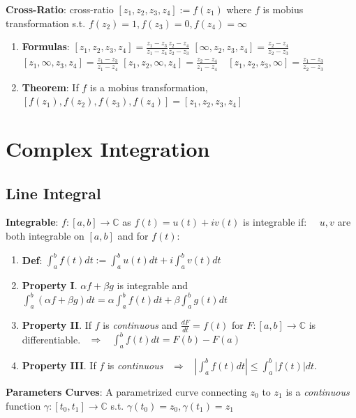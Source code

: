 \documentclass[9pt]{article}
\begin{document}
\textbf{Cross-Ratio}: cross-ratio $[z_1,z_2,z_3,z_4]:=f(z_1)$ where $f$ is mobius transformation s.t. $f(z_2)=1,f(z_3)=0,f(z_4)=\infty$

\begin{enumerate}[itemsep=-2pt, topsep=-2pt]
    \item \textbf{Formulas}: {\footnotesize $[z_1,z_2,z_3,z_4]=\frac{z_1-z_3}{z_1-z_4}\frac{z_2-z_4}{z_2-z_3}$ \quad $[\infty,z_2,z_3,z_4]=\frac{z_2-z_4}{z_2-z_3}$ \quad $[z_1,\infty,z_3,z_4]=\frac{z_1-z_3}{z_1-z_4}$ \quad $[z_1,z_2,\infty,z_4]=\frac{z_2-z_4}{z_1-z_4} \quad [z_1,z_2,z_3,\infty]=\frac{z_1-z_3}{z_2-z_3}$}
    \item \textbf{Theorem}: If $f$ is a mobius transformation, $[f(z_1),f(z_2),f(z_3),f(z_4)]=[z_1,z_2,z_3,z_4]$ \qquad {}
\end{enumerate}


\section{Complex Integration} %

\subsection{Line Integral} %

\textbf{Integrable}: $f:[a,b]\to \mathbb{C}$ as $f(t)=u(t)+iv(t)$ is integrable if: \ \ $u,v$ are both integrable on $[a,b]$ and for $f(t)$:

\begin{enumerate}[itemsep=-2pt, topsep=-2pt]
    \item \textbf{Def}: $\int_a^b f(t)dt:=\int_a^b u(t)dt+i\int_a^b v(t)dt$
    \item \textbf{Property I}. $\alpha f+\beta g$ is integrable and $\int_a^b(\alpha f+\beta g)dt=\alpha\int_a^b f(t)dt+\beta\int_a^b g(t)dt$
    \item \textbf{Property II}. If $f$ is \textit{continuous} and $\frac{dF}{dt}=f(t)$ for $F:[a,b]\to\mathbb{C}$ is differentiable. \ $\Rightarrow$ \ $\int_a^b f(t)dt=F(b)-F(a)$
    \item \textbf{Property III}. If $f$ is \textit{continuous} \ $\Rightarrow$ \ $\left|\int_a^b f(t)dt\right|\leq\int_a^b|f(t)|dt$.
\end{enumerate}

\textbf{Parameters Curves}: A parametrized curve connecting $z_0$ to $z_1$ is a \textit{continuous} function $\gamma:[t_0,t_1]\to\mathbb{C}$ s.t. $\gamma(t_0)=z_0,\gamma(t_1)=z_1$
\end{document}
